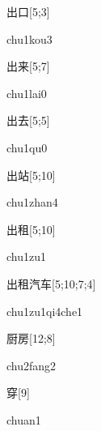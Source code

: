 \begin{verbete}{出口}[5;3]
\begin{pronuncia}{chu1kou3}
\end{pronuncia}
\end{verbete}

\begin{verbete}[chu1qu0]{出来}[5;7]
\begin{pronuncia}{chu1lai0}
\end{pronuncia}
\end{verbete}

\begin{verbete}[chu1qu0]{出去}[5;5]
\begin{pronuncia}{chu1qu0}
\end{pronuncia}
\end{verbete}

\begin{verbete}{出站}[5;10]
\begin{pronuncia}{chu1zhan4}
\end{pronuncia}
\end{verbete}

\begin{verbete}[chu1zu1]{出租}[5;10]
\begin{pronuncia}{chu1zu1}
\end{pronuncia}
\end{verbete}

\begin{verbete}{出租汽车}[5;10;7;4]
\begin{pronuncia}[\\]{chu1zu1qi4che1}
\end{pronuncia}
\end{verbete}

\begin{verbete}{厨房}[12;8]
\begin{pronuncia}{chu2fang2}
\end{pronuncia}
\end{verbete}

\begin{verbete}[chuan1]{穿}[9]
\begin{pronuncia}{chuan1}
\end{pronuncia}
\end{verbete}

